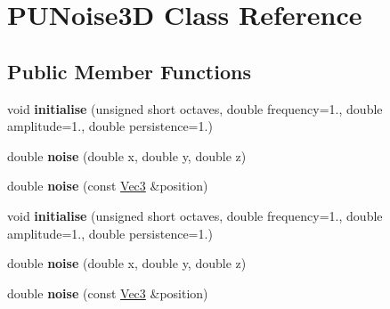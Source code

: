 \hypertarget{classPUNoise3D}{}\section{P\+U\+Noise3D Class Reference}
\label{classPUNoise3D}
\subsection*{Public Member Functions}
\begin{DoxyCompactItemize}
\item 
\mbox{\label{classPUNoise3D_a93158f328fc4c4c3dcf39dd036b15634}} 
void {\bfseries initialise} (unsigned short octaves, double frequency=1., double amplitude=1., double persistence=1.)
\item 
\mbox{\label{classPUNoise3D_acec554dcadc7b82d8ec9723d90b9ac77}} 
double {\bfseries noise} (double x, double y, double z)
\item 
\mbox{\label{classPUNoise3D_ab559404334ce338ca770101b02c8e2db}} 
double {\bfseries noise} (const \hyperlink{classVec3}{Vec3} \&position)
\item 
\mbox{\label{classPUNoise3D_a93158f328fc4c4c3dcf39dd036b15634}} 
void {\bfseries initialise} (unsigned short octaves, double frequency=1., double amplitude=1., double persistence=1.)
\item 
\mbox{\label{classPUNoise3D_acec554dcadc7b82d8ec9723d90b9ac77}} 
double {\bfseries noise} (double x, double y, double z)
\item 
\mbox{\label{classPUNoise3D_ab559404334ce338ca770101b02c8e2db}} 
double {\bfseries noise} (const \hyperlink{classVec3}{Vec3} \&position)
\end{DoxyCompactItemize}
